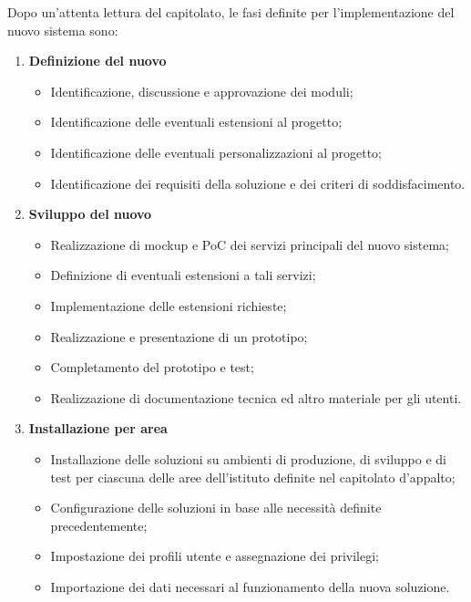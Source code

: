 	Dopo un'attenta lettura del capitolato, le fasi definite per l'implementazione del nuovo sistema sono:
	\begin{enumerate}
		\item \textbf{Definizione del nuovo \helpdesk}
			\begin{itemize}[noitemsep]
				\renewcommand\labelitemi{--}
				\item Identificazione, discussione e approvazione dei moduli;
				\item Identificazione delle eventuali estensioni al progetto;
				\item Identificazione delle eventuali personalizzazioni al progetto;
				\item Identificazione dei requisiti della soluzione e dei criteri di soddisfacimento.
			\end{itemize}
			
		\item \textbf{Sviluppo del nuovo \helpdesk}
			\begin{itemize}[noitemsep]
				\renewcommand\labelitemi{--}
				\item Realizzazione di mockup e PoC dei servizi principali del nuovo sistema;
				\item Definizione di eventuali estensioni a tali servizi;
				\item Implementazione delle estensioni richieste;
				\item Realizzazione e presentazione di un prototipo;
				\item Completamento del prototipo e test;
				\item Realizzazione di documentazione tecnica ed altro materiale per gli utenti.
			\end{itemize}
			
		\newpage
		\item \textbf{Installazione per area}
			\begin{itemize}[noitemsep]
				\renewcommand\labelitemi{--}
				\item Installazione delle soluzioni su ambienti di produzione, di sviluppo e di test per ciascuna delle aree dell'istituto definite nel capitolato d'appalto;
				\item Configurazione delle soluzioni in base alle necessità definite precedentemente;
				\item Impostazione dei profili utente e assegnazione dei privilegi;
				\item Importazione dei dati necessari al funzionamento della nuova soluzione.
			\end{itemize}
		

\end{enumerate}
